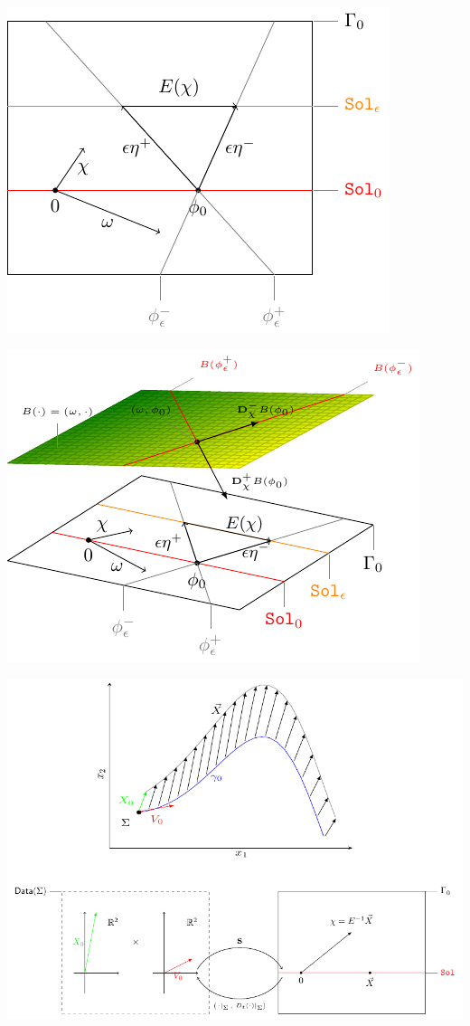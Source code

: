 \documentclass{article}
\begin{document}
	\includegraphics[width=\textwidth]{../Pictures/compsupp_GeometricPicture2}
				
	\includegraphics[width=\textwidth]{../Pictures/compsupp_GeometricPictureLinear}
				
	\includegraphics[width=\textwidth]{../Pictures/Jacobi_GeometricPicturePanoramica}	
				
\end{document}
